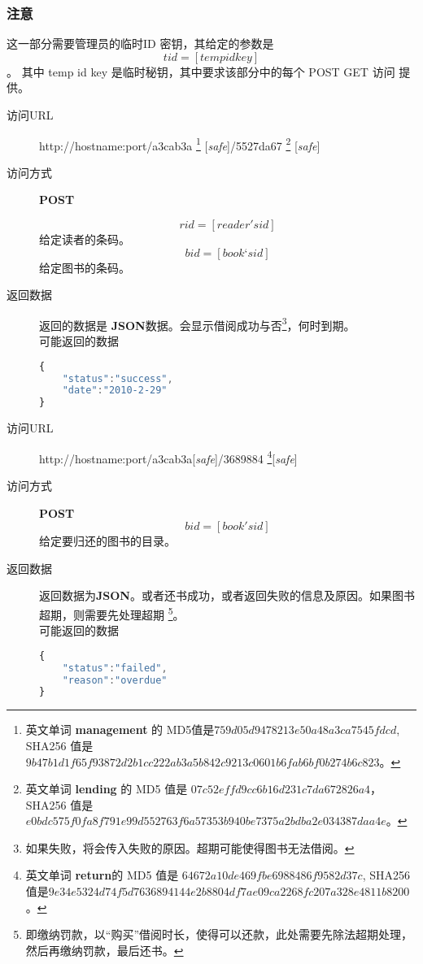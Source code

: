 \documentclass[UTF8]{article}
\def\safe{[\textit{safe}]}
\def\POST{\textbf{POST}}
\def\bfJSON{\textbf{JSON}}
\def\viaurl{\item[访问URL]}
\def\viareq#1{\item[访问方式] #1}
\def\rtdata{\item[返回数据]}
\begin{document}
        \subsubsection*{注意}
        这一部分需要管理员的临时ID 密钥，其给定的参数是
        $$tid=[temp id key]$$。
        其中 temp id key 是临时秘钥，其中要求该部分中的每个 POST GET 访问 提供。
        \begin{description}
            \viaurl http://hostname:port/a3cab3a
                \footnote{
                    英文单词 \textbf{management} 的
                    MD5值是$759d05d9478213e50a48a3ca7545fdcd$,
                    SHA256 值是
                    $9b47b1d1f65f93872d2b1cc222ab3a5b842c9213c0601b6fab6bf0b274b6c823$。
                }
                \safe/5527da67
                \footnote{
                    英文单词 \textbf{lending} 的
                    MD5 值是
                    $07c52effd9cc6b16d231c7da672826a4$，
                    SHA256 值是
                    $e0bdc575f0fa8f791e99d552763f6a57353b940be7375a2bdba2e034387daa4e$。
                }
                \safe
                
                \viareq{\POST}
                
                $$rid=[reader's id]$$
                给定读者的条码。
                $$bid=[book‘s id]$$
                给定图书的条码。
                \rtdata 
                返回的数据是 \bfJSON 数据。会显示借阅成功与否\footnote{如果失败，将会传入失败的原因。超期可能使得图书无法借阅。}，何时到期。
                \\  可能返回的数据
                \begin{lstlisting}[language=JavaScript]
{
	"status":"success",
	"date":"2010-2-29"
}
                \end{lstlisting}
        \end{description}
        \begin{description}
	        \viaurl  http://hostname:port/a3cab3a\safe/3689884
	        \footnote{
	        	英文单词 \textbf{return}的
	        	MD5 值是 $64672a10de469fbe6988486f9582d37c$,
	        	SHA256值是$9e34e5324d74f5d7636894144e2b8804df7ae09ca2268fc207a328e4811b8200$。
	        }\safe
	        \viareq{\POST}
	        $$bid=[book's id]$$
	        给定要归还的图书的目录。
	        \rtdata 返回数据为\bfJSON 。或者还书成功，或者返回失败的信息及原因。如果图书超期，则需要先处理超期
	        \footnote{即缴纳罚款，以“购买”借阅时长，使得可以还款，此处需要先除法超期处理，然后再缴纳罚款，最后还书。}。
	        \\ 可能返回的数据
	        \begin{lstlisting}[language=JavaScript]
{
	"status":"failed",
	"reason":"overdue"
}
	        \end{lstlisting}
	        \end{description}
\end{document}
